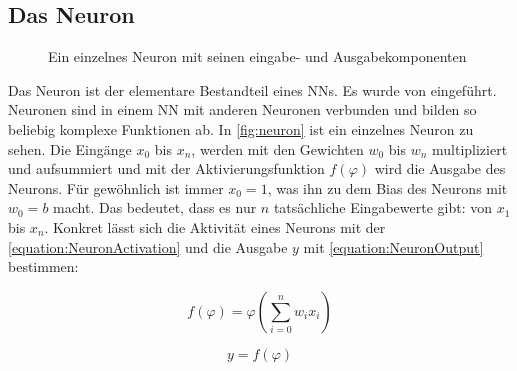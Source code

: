 \subsection{Das Neuron}

\begin{figure}
  \centering
  \caption{Ein einzelnes Neuron mit seinen eingabe- und Ausgabekomponenten}
  \label{fig:neuron}
\end{figure}

Das Neuron ist der elementare Bestandteil eines \acp{NN}. Es wurde \citeyear{McCulloch1943} von \citeauthor{McCulloch1943} \cite{McCulloch1943} eingeführt. Neuronen sind in einem \ac{NN} mit anderen Neuronen verbunden und bilden so beliebig komplexe Funktionen ab. In \autoref{fig:neuron} ist ein einzelnes Neuron zu sehen. Die Eingänge $x_{0}$ bis $x_{n}$, werden mit den Gewichten $w_{0}$ bis $w_{n}$ multipliziert und aufsummiert und mit der Aktivierungsfunktion $f(\varphi)$ wird die Ausgabe des Neurons. Für gewöhnlich ist immer $x_{0}=1$, was ihn zu dem Bias des Neurons mit $w_{0}=b$ macht. Das bedeutet, dass es nur $n$ tatsächliche Eingabewerte gibt: von $x_{1}$ bis $x_{n}$. Konkret lässt sich die Aktivität eines Neurons mit der \autoref{equation:NeuronActivation} und die Ausgabe $y$ mit \autoref{equation:NeuronOutput} bestimmen:

\begin{equation}
  f(\varphi) = \varphi(\sum_{i=0}^{n}w_{i}x_{i})
  \label{equation:NeuronActivation}
\end{equation}

\begin{equation}
  y = f(\varphi)
  \label{equation:NeuronOutput}
\end{equation}

